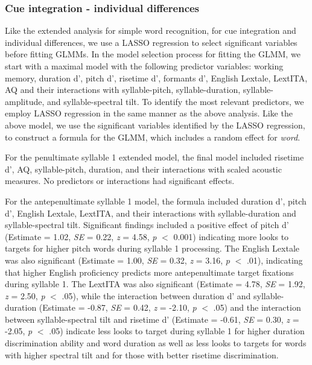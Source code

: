 \subsubsection{Cue integration - individual differences}

Like the extended analysis for simple word recognition, for cue integration and individual differences, we use a LASSO regression to select significant variables before fitting GLMMs. In the model selection process for fitting the GLMM, we start with a maximal model with the following predictor variables: working memory, duration d', pitch d', risetime d', formants d', English Lextale, LextITA, AQ and their interactions with syllable-pitch, syllable-duration, syllable-amplitude, and syllable-spectral tilt. To identify the most relevant predictors, we employ LASSO regression in the same manner as the above analysis. Like the above model, we use the significant variables identified by the LASSO regression, to construct a formula for the GLMM, which includes a random effect for \textit{word}. 

For the penultimate syllable 1 extended model, the final model included risetime d', AQ, syllable-pitch, duration, and their interactions with scaled acoustic measures. No predictors or interactions had significant effects.

For the antepenultimate syllable 1 model, the formula included duration d', pitch d', English Lextale, LextITA, and their interactions with syllable-duration and syllable-spectral tilt. Significant findings included a positive effect of pitch d' (Estimate = 1.02, \textit{SE} = 0.22, \textit{z} = 4.58, \textit{p} $<$ 0.001) indicating more looks to targets for higher pitch words during syllable 1 processing. The English Lextale was also significant (Estimate = 1.00, \textit{SE} = 0.32, \textit{z} = 3.16, \textit{p} $<$ .01), indicating that higher English proficiency predicts more antepenultimate target fixations during syllable 1. The LextITA was also significant (Estimate = 4.78, \textit{SE} = 1.92, \textit{z} = 2.50, \textit{p} $<$ .05), while the interaction between duration d' and syllable-duration (Estimate = -0.87, \textit{SE} = 0.42, \textit{z} = -2.10, \textit{p} $<$ .05) and the interaction between syllable-spectral tilt and risetime d' (Estimate = -0.61, \textit{SE} = 0.30, \textit{z} = -2.05, \textit{p} $<$ .05) indicate less looks to target during syllable 1 for higher duration discrimination ability and word duration as well as less looks to targets for words with higher spectral tilt and for those with better risetime discrimination.

